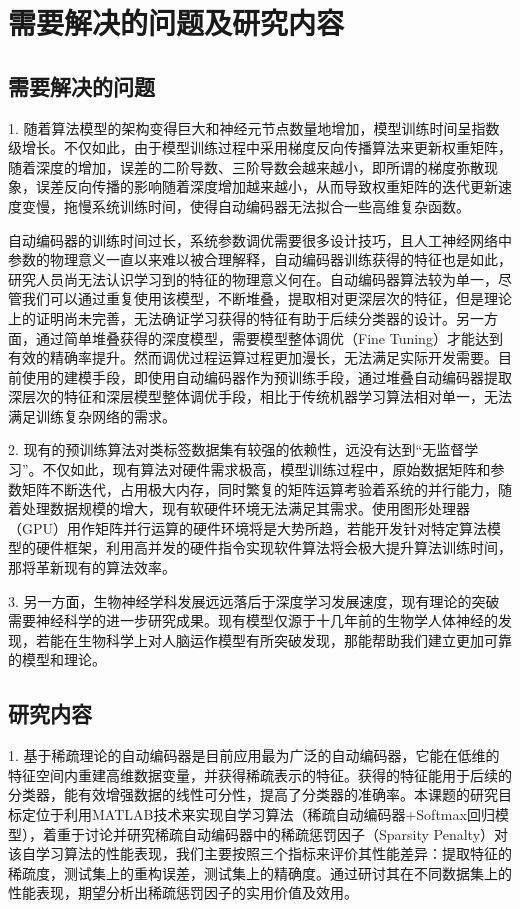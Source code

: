 \documentclass[oneside]{ZJUthesis}
\begin{document}
\section{需要解决的问题及研究内容}
\subsection{需要解决的问题}
1. 随着算法模型的架构变得巨大和神经元节点数量地增加，模型训练时间呈指数级增长。不仅如此，由于模型训练过程中采用梯度反向传播算法来更新权重矩阵，随着深度的增加，误差的二阶导数、三阶导数会越来越小，即所谓的梯度弥散现象，误差反向传播的影响随着深度增加越来越小，从而导致权重矩阵的迭代更新速度变慢，拖慢系统训练时间，使得自动编码器无法拟合一些高维复杂函数\cite{35}。 

自动编码器的训练时间过长，系统参数调优需要很多设计技巧，且人工神经网络中参数的物理意义一直以来难以被合理解释，自动编码器训练获得的特征也是如此，研究人员尚无法认识学习到的特征的物理意义何在。自动编码器算法较为单一，尽管我们可以通过重复使用该模型，不断堆叠，提取相对更深层次的特征，但是理论上的证明尚未完善，无法确证学习获得的特征有助于后续分类器的设计。另一方面，通过简单堆叠获得的深度模型，需要模型整体调优（Fine Tuning）才能达到有效的精确率提升。然而调优过程运算过程更加漫长，无法满足实际开发需要。目前使用的建模手段，即使用自动编码器作为预训练手段，通过堆叠自动编码器提取深层次的特征和深层模型整体调优手段，相比于传统机器学习算法相对单一，无法满足训练复杂网络的需求\cite{40}。

2. 现有的预训练算法对类标签数据集有较强的依赖性，远没有达到``无监督学习''\cite{41}。不仅如此，现有算法对硬件需求极高，模型训练过程中，原始数据矩阵和参数矩阵不断迭代，占用极大内存，同时繁复的矩阵运算考验着系统的并行能力，随着处理数据规模的增大，现有软硬件环境无法满足其需求。使用图形处理器（GPU）用作矩阵并行运算的硬件环境将是大势所趋，若能开发针对特定算法模型的硬件框架，利用高并发的硬件指令实现软件算法将会极大提升算法训练时间，那将革新现有的算法效率\cite{43}。

3. 另一方面，生物神经学科发展远远落后于深度学习发展速度，现有理论的突破需要神经科学的进一步研究成果\cite{36,37}。现有模型仅源于十几年前的生物学人体神经的发现，若能在生物科学上对人脑运作模型有所突破发现，那能帮助我们建立更加可靠的模型和理论。

\subsection{研究内容}
1. 基于稀疏理论的自动编码器是目前应用最为广泛的自动编码器，它能在低维的特征空间内重建高维数据变量，并获得稀疏表示的特征。获得的特征能用于后续的分类器，能有效增强数据的线性可分性，提高了分类器的准确率。本课题的研究目标定位于利用MATLAB技术来实现自学习算法（稀疏自动编码器+Softmax回归模型），着重于讨论并研究稀疏自动编码器中的稀疏惩罚因子（Sparsity Penalty）对该自学习算法的性能表现，我们主要按照三个指标来评价其性能差异：提取特征的稀疏度，测试集上的重构误差，测试集上的精确度。通过研讨其在不同数据集上的性能表现，期望分析出稀疏惩罚因子的实用价值及效用。
\end{document}
